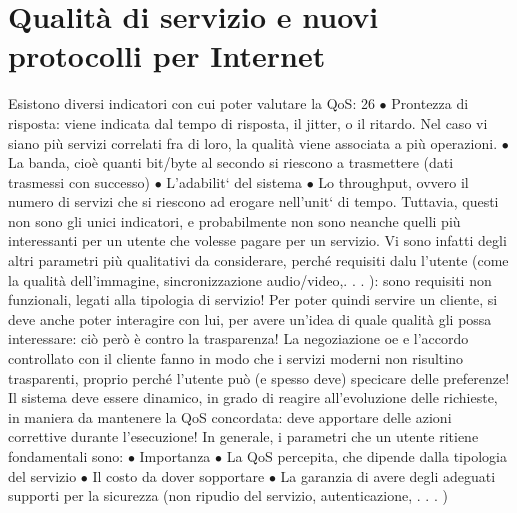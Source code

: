 
\section{Qualità di servizio e nuovi protocolli per Internet}
Esistono diversi indicatori con cui poter valutare la QoS:
26
$\bullet$ Prontezza di risposta: viene indicata dal tempo di risposta, il jitter, o il
ritardo. Nel caso vi siano più servizi correlati fra di loro, la qualità viene
associata a più operazioni.
$\bullet$ La banda, cioè quanti bit/byte al secondo si riescono a trasmettere (dati
trasmessi con successo)
$\bullet$ L'adabilit` del sistema
$\bullet$ Lo throughput, ovvero il numero di servizi che si riescono ad erogare
nell'unit` di tempo.
Tuttavia, questi non sono gli unici indicatori, e probabilmente non sono neanche
quelli più interessanti per un utente che volesse pagare per un servizio. Vi sono
infatti degli altri parametri più qualitativi da considerare, perché requisiti dalu
l'utente (come la qualità dell'immagine, sincronizzazione audio/video,. . . ): sono
requisiti non funzionali, legati alla tipologia di servizio! Per poter quindi servire
un cliente, si deve anche poter interagire con lui, per avere un'idea di quale
qualità gli possa interessare: ciò però è contro la trasparenza! La negoziazione
oe
e l'accordo controllato con il cliente fanno in modo che i servizi moderni non
risultino trasparenti, proprio perché l'utente può (e spesso deve) specicare delle
preferenze! Il sistema deve essere dinamico, in grado di reagire all'evoluzione
delle richieste, in maniera da mantenere la QoS concordata: deve apportare
delle azioni correttive durante l'esecuzione! In generale, i parametri che un
utente ritiene fondamentali sono:
$\bullet$ Importanza
$\bullet$ La QoS percepita, che dipende dalla tipologia del servizio
$\bullet$ Il costo da dover sopportare
$\bullet$ La garanzia di avere degli adeguati supporti per la sicurezza (non ripudio
del servizio, autenticazione, . . . )
